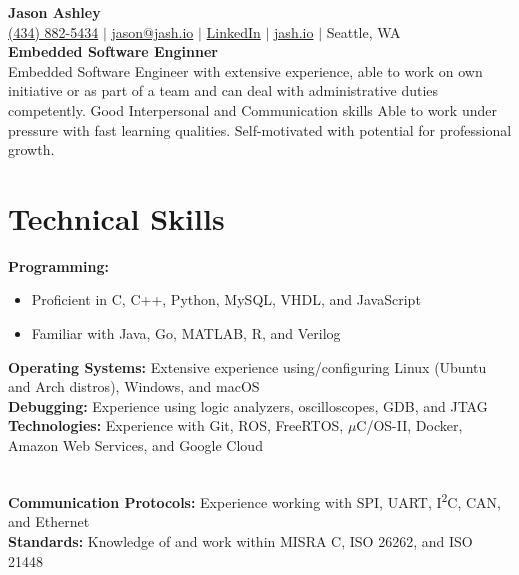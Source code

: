 \documentclass[letterpaper,11pt]{article}
\newcommand{\resumeItem}[1]{
  \item\small{
    {#1 \vspace{-2pt}}
  }
}
\newcommand{\resumeSubHeadingListStart}{\begin{itemize}[leftmargin=0pt, label={}]}
\newcommand{\resumeSubHeadingListEnd}{\end{itemize}}
\newcommand{\resumeItemListStart}{\begin{itemize}}
\newcommand{\resumeItemListEnd}{\end{itemize}\vspace{-7pt}}
\begin{document}

\begin{center}
    \textbf{\Huge Jason Ashley} \\ \vspace{3pt}
    \small
    \faMobile\hspace{.5pt} \href{tel:14348825434}{(434) 882-5434}
    $|$
    \faAt\hspace{.5pt} \href{mailto:jason@jash.io}{jason@jash.io}
    $|$
    \faLinkedinSquare\hspace{.5pt} \href{https://www.linkedin.com/in/subject-name-here/}{LinkedIn}
    $|$
    \faGlobe\hspace{.5pt} \href{https://jash.io}{jash.io}
    $|$
    \faMapMarker\hspace{.5pt} Seattle, WA \\
    \textbf{Embedded Software Enginner} \\
    Embedded Software Engineer with extensive experience, able to work on own initiative or as part of a team and can deal with administrative duties competently. Good Interpersonal and Communication skills Able to work under pressure with fast learning qualities. Self-motivated with potential for professional growth.
\end{center}


\section{Technical Skills}
\vspace{1pt}
\resumeSubHeadingListStart{}
  \small{\item{
      \textbf{Programming:} \vspace{-7pt}
      \resumeItemListStart{}
        \resumeItem{Proficient in C, C++, Python, MySQL, VHDL, and JavaScript}
        \resumeItem{Familiar with Java, Go, MATLAB, R, and Verilog}
      \resumeItemListEnd{}
      \textbf{Operating Systems:} Extensive experience using/configuring Linux (Ubuntu and Arch distros), Windows, and macOS \\ \vspace{1pt}
      \textbf{Debugging:} Experience using logic analyzers, oscilloscopes, GDB, and JTAG \\ \vspace{1pt}
      \textbf{Technologies:} Experience with Git, ROS, FreeRTOS, $\mu{}$C/OS-II, Docker, Amazon Web Services, and Google Cloud} \\ \vspace{1pt}
      \textbf{Communication Protocols:} Experience working with SPI, UART, I\textsuperscript{2}C, CAN, and Ethernet \\ \vspace{1pt}
      \textbf{Standards:} Knowledge of and work within MISRA C, ISO 26262, and ISO 21448 \\ \vspace{1pt}
  }
\resumeSubHeadingListEnd{}
\end{document}
